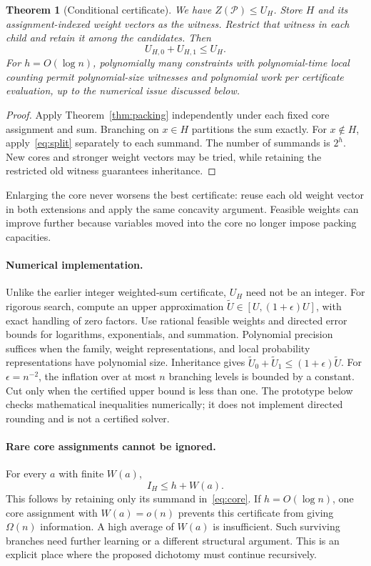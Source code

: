 \documentclass[11pt,a4paper]{article}
\newtheorem{theorem}{Theorem}
\theoremstyle{definition}
\theoremstyle{remark}
\newcommand{\Pcal}{\mathcal P}
\begin{document}
\begin{theorem}[Conditional certificate]\label{thm:core}
We have $Z(\Pcal)\le U_H$. Store $H$ and its assignment-indexed weight
vectors as the witness. Restrict that witness in each child and retain it
among the candidates. Then
\[
 U_{H,0}+U_{H,1}\le U_H.
\]
For $h=O(\log n)$, polynomially many constraints with polynomial-time
local counting permit polynomial-size witnesses and polynomial work per
certificate evaluation, up to the numerical issue discussed below.
\end{theorem}
\begin{proof}
Apply Theorem~\ref{thm:packing} independently under each fixed core
assignment and sum. Branching on $x\in H$ partitions the sum exactly.
For $x\notin H$, apply~\eqref{eq:split} separately to each summand.
The number of summands is $2^h$. New cores and stronger weight vectors may
be tried, while retaining the restricted old witness guarantees inheritance.
\end{proof}

Enlarging the core never worsens the best certificate: reuse each old
weight vector in both extensions and apply the same concavity argument.
Feasible weights can improve further because variables moved into the core
no longer impose packing capacities.

\paragraph{Numerical implementation.}
Unlike the earlier integer weighted-sum certificate, $U_H$ need not be
an integer. For rigorous search, compute an upper approximation
$\widetilde U\in[U,(1+\epsilon)U]$, with exact handling of zero factors.
Use rational feasible weights and directed error bounds for logarithms,
exponentials, and summation. Polynomial precision suffices when the family,
weight representations, and local probability representations have
polynomial size. Inheritance gives
$\widetilde U_0+\widetilde U_1\le(1+\epsilon)\widetilde U$.
For $\epsilon=n^{-2}$, the inflation over at most $n$ branching levels is
bounded by a constant. Cut only when the certified upper bound is less
than one. The prototype below checks mathematical inequalities numerically;
it does not implement directed rounding and is not a certified solver.

\paragraph{Rare core assignments cannot be ignored.}
For every $a$ with finite $W(a)$,
\begin{equation}
 I_H\le h+W(a).                                      \label{eq:worstcore}
\end{equation}
This follows by retaining only its summand in~\eqref{eq:core}.
If $h=O(\log n)$, one core assignment with $W(a)=o(n)$ prevents this
certificate from giving $\Omega(n)$ information. A high average of $W(a)$
is insufficient. Such surviving branches need further learning or a
different structural argument. This is an explicit place where the
proposed dichotomy must continue recursively.
\end{document}
